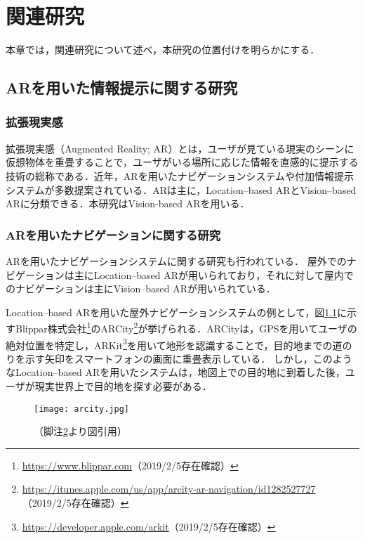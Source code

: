 \chapter{関連研究}
\label{chapter:relatedwork}
本章では，関連研究について述べ，本研究の位置付けを明らかにする．

\section{ARを用いた情報提示に関する研究}
  \subsection{拡張現実感}
    拡張現実感（Augmented Reality; AR）とは，ユーザが見ている現実のシーンに仮想物体を重畳することで，ユーザがいる場所に応じた情報を直感的に提示する技術の総称である\cite{Kambara:2010}．近年，ARを用いたナビゲーションシステムや付加情報提示システムが多数提案されている．ARは主に，Location--based ARとVision--based ARに分類できる\cite{Chatzopoulos:2017}．本研究はVision-based ARを用いる．

  \subsection{ARを用いたナビゲーションに関する研究}
    ARを用いたナビゲーションシステムに関する研究も行われている．
    屋外でのナビゲーションは主にLocation--based ARが用いられており，それに対して屋内でのナビゲーションは主にVision--based ARが用いられている．

    Location--based ARを用いた屋外ナビゲーションシステムの例として，図\ref{figure:arcity}に示すBlippar株式会社\footnote{\url{https://www.blippar.com}（2019/2/5存在確認）}のARCity\footnote{\url{https://itunes.apple.com/us/app/arcity-ar-navigation/id1282527727}\label{footnote:arcity}（2019/2/5存在確認）}が挙げられる．ARCityは，GPSを用いてユーザの絶対位置を特定し，ARKit\footnote{\url{https://developer.apple.com/arkit}（2019/2/5存在確認）}を用いて地形を認識することで，目的地までの道のりを示す矢印をスマートフォンの画面に重畳表示している．
    しかし，このようなLocation--based ARを用いたシステムは，地図上での目的地に到着した後，ユーザが現実世界上で目的地を探す必要がある．
    \begin{figure}[tb]
      \centerline{\texttt{[image: arcity.jpg]}}
      \caption{（脚注\ref{footnote:arcity}より図引用）}
      \label{figure:arcity}
    \end{figure}

